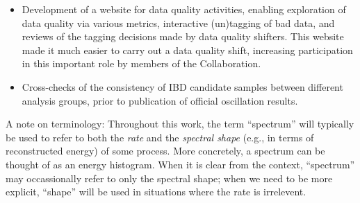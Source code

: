 \documentclass[../thesis.tex]{subfiles}
\begin{document}
\begin{itemize}
\item Development of a website for data quality activities, enabling exploration of data quality via various metrics, interactive (un)tagging of bad data, and reviews of the tagging decisions made by data quality shifters. This website made it much easier to carry out a data quality shift, increasing participation in this important role by members of the Collaboration.
\item Cross-checks of the consistency of IBD candidate samples between different analysis groups, prior to publication of official oscillation results.
\end{itemize}

A note on terminology: Throughout this work, the term ``spectrum'' will typically be used to refer to both the \emph{rate} and the \emph{spectral shape} (e.g., in terms of reconstructed energy) of some process. More concretely, a spectrum can be thought of as an energy histogram. When it is clear from the context, ``spectrum'' may occassionally refer to only the spectral shape; when we need to be more explicit, ``shape'' will be used in situations where the rate is irrelevent.
\end{document}
